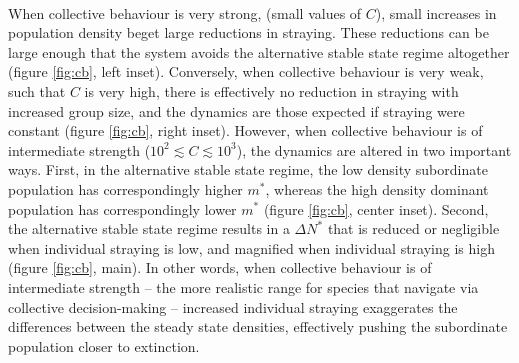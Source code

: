 \documentclass{revtex4}
\begin{document}
 \\
When collective behaviour is very strong, (small values of $C$), small increases in population density beget large reductions in straying.
These reductions can be large enough that the system avoids the alternative stable state regime altogether (figure \ref{fig:cb}, left inset).
Conversely, when collective behaviour is very weak, such that $C$ is very high, there is effectively no reduction in straying with increased group size, and the dynamics are those expected if straying were constant (figure \ref{fig:cb}, right inset).
However, when collective behaviour is of intermediate strength ($10^{2} \lesssim C \lesssim 10^3$), the dynamics are altered in two important ways.
First, in the alternative stable state regime, the low density subordinate population has correspondingly higher $m^*$, whereas the high density dominant population has correspondingly lower $m^*$ (figure \ref{fig:cb}, center inset).
Second, the alternative stable state regime results in a $\Delta N^*$ that is reduced or negligible when individual straying is low, and magnified when individual straying is high (figure \ref{fig:cb}, main).
In other words, when collective behaviour is of intermediate strength -- the more realistic range for species that navigate via collective decision-making -- increased individual straying exaggerates the differences between the steady state densities, effectively pushing the subordinate population closer to extinction.
\end{document}
